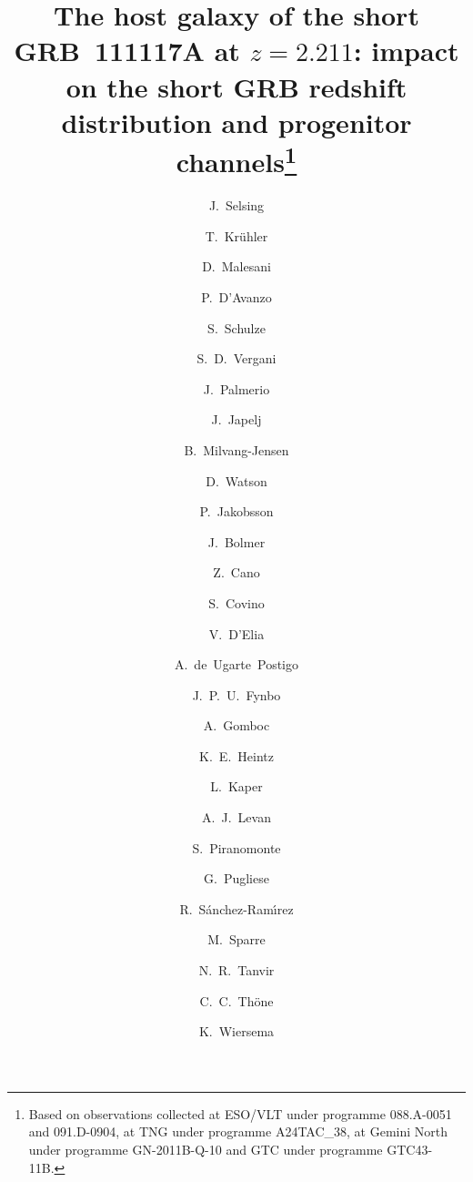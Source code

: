 \documentclass[longauth]{aa}    %
\begin{document}
        
\title{The host galaxy of the short GRB~111117A at $z = 2.211$: impact on the short GRB redshift distribution and progenitor channels\thanks{Based on observations collected at ESO/VLT under programme 088.A-0051 and 091.D-0904, at TNG under programme A24TAC\_38, at Gemini North under programme GN-2011B-Q-10 and GTC under programme GTC43-11B.}}



\author{J.~Selsing
        \and T.~Kr\"{u}hler
        \and D.~Malesani
        \and P.~D'Avanzo
        \and S.~Schulze 
        \and S.~D.~Vergani
        \and J.~Palmerio
        \and J.~Japelj
        \and B.~Milvang-Jensen
        \and D.~Watson
        \and P.~Jakobsson
        \and J.~Bolmer 
        \and Z.~Cano
        \and S.~Covino 
        \and V.~D'Elia
        \and A.~de~Ugarte~Postigo
        \and J.~P.~U.~Fynbo
        \and A.~Gomboc
        \and K.~E.~Heintz
        \and L.~Kaper 
        \and A.~J.~Levan 
        \and S.~Piranomonte 
        \and G.~Pugliese 
        \and R.~S\'{a}nchez-Ram\'{\i}rez 
        \and M.~Sparre
        \and N.~R.~Tanvir
        \and C.~C.~Th\"{o}ne
        \and K.~Wiersema 
}
\end{document}
